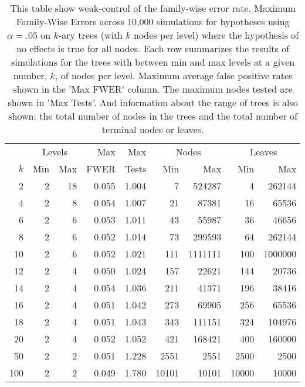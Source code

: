 \begin{table}[ht]
\centering
\begin{tabular}{rrrrrrrrr}
  \toprule
  &\multicolumn{2}{c}{Levels} &Max&Max& \multicolumn{2}{c}{Nodes} & \multicolumn{2}{c}{Leaves}\\ $k$ & Min & Max & FWER & Tests & Min & Max & Min & Max \\ \midrule
   2 &    2 &   18 & 0.055 & 1.004 &    7 & 524287 &    4 & 262144 \\ 
     4 &    2 &    8 & 0.054 & 1.007 &   21 & 87381 &   16 & 65536 \\ 
     6 &    2 &    6 & 0.053 & 1.011 &   43 & 55987 &   36 & 46656 \\ 
     8 &    2 &    6 & 0.052 & 1.014 &   73 & 299593 &   64 & 262144 \\ 
    10 &    2 &    6 & 0.052 & 1.021 &  111 & 1111111 &  100 & 1000000 \\ 
    12 &    2 &    4 & 0.050 & 1.024 &  157 & 22621 &  144 & 20736 \\ 
    14 &    2 &    4 & 0.054 & 1.036 &  211 & 41371 &  196 & 38416 \\ 
    16 &    2 &    4 & 0.051 & 1.042 &  273 & 69905 &  256 & 65536 \\ 
    18 &    2 &    4 & 0.051 & 1.043 &  343 & 111151 &  324 & 104976 \\ 
    20 &    2 &    4 & 0.052 & 1.052 &  421 & 168421 &  400 & 160000 \\ 
    50 &    2 &    2 & 0.051 & 1.228 & 2551 & 2551 & 2500 & 2500 \\ 
   100 &    2 &    2 & 0.049 & 1.780 & 10101 & 10101 & 10000 & 10000 \\ 
   \bottomrule
\end{tabular}
\caption{This table show weak-control of the
  family-wise error rate. Maximum Family-Wise Errors across 10,000 simulations
  for hypotheses using $\alpha=.05$ on $k$-ary trees (with $k$ nodes per
  level) where the hypothesis of no effects is true for all nodes. Each row
  summarizes the results of simulations for the trees with  between min and max
  levels at a given number, $k$, of nodes per level. Maximum average false
  positive rates shown in the 'Max FWER' column. The maximum nodes tested are
  shown in 'Max Tests'. And information about the range of trees is also shown:
  the total number of nodes in the trees and the total number of terminal nodes
  or leaves.} 
\label{tab:weak_control_sim}
\end{table}
